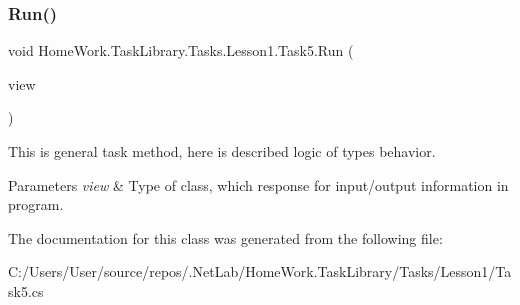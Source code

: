\subsubsection{\texorpdfstring{Run()}{Run()}}
{\footnotesize\ttfamily void Home\+Work.\+Task\+Library.\+Tasks.\+Lesson1.\+Task5.\+Run (\begin{DoxyParamCaption}\item[{I\+Information}]{view }\end{DoxyParamCaption})}



This is general task method, here is described logic of types behavior. 


\begin{DoxyParams}{Parameters}
{\em view} & Type of class, which response for input/output information in program.\\
\hline
\end{DoxyParams}


The documentation for this class was generated from the following file\+:\begin{DoxyCompactItemize}
\item 
C\+:/\+Users/\+User/source/repos/.\+Net\+Lab/\+Home\+Work.\+Task\+Library/\+Tasks/\+Lesson1/Task5.\+cs\end{DoxyCompactItemize}
